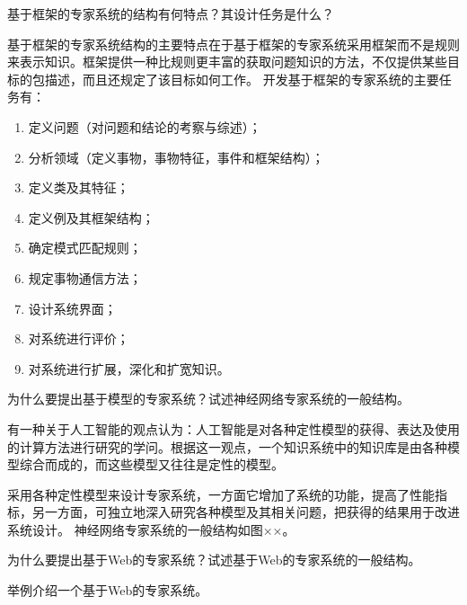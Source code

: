 \begin{question}
基于框架的专家系统的结构有何特点？其设计任务是什么？
\end{question}
\begin{solution}
基于框架的专家系统结构的主要特点在于基于框架的专家系统采用框架而不是规则来表示知识。框架提供一种比规则更丰富的获取问题知识的方法，不仅提供某些目标的包描述，而且还规定了该目标如何工作。 
开发基于框架的专家系统的主要任务有：
	\begin{enumerate}
		\item 定义问题（对问题和结论的考察与综述）；
		\item 分析领域（定义事物，事物特征，事件和框架结构）；
		\item 定义类及其特征；
		\item 定义例及其框架结构；
		\item 确定模式匹配规则；
		\item 规定事物通信方法；
		\item 设计系统界面；
		\item 对系统进行评价；
		\item 对系统进行扩展，深化和扩宽知识。
	\end{enumerate}
\end{solution}

\begin{question}
为什么要提出基于模型的专家系统？试述神经网络专家系统的一般结构。
\end{question}
\begin{solution}
有一种关于人工智能的观点认为：人工智能是对各种定性模型的获得、表达及使用的计算方法进行研究的学问。根据这一观点，一个知识系统中的知识库是由各种模型综合而成的，而这些模型又往往是定性的模型。 \par
采用各种定性模型来设计专家系统，一方面它增加了系统的功能，提高了性能指标，另一方面，可独立地深入研究各种模型及其相关问题，把获得的结果用于改进系统设计。
神经网络专家系统的一般结构如图××。
\end{solution}

\begin{question}
为什么要提出基于Web的专家系统？试述基于Web的专家系统的一般结构。
\end{question}
\begin{solution}
\end{solution}

\begin{question}
举例介绍一个基于Web的专家系统。
\end{question}
\begin{solution}
\end{solution}

